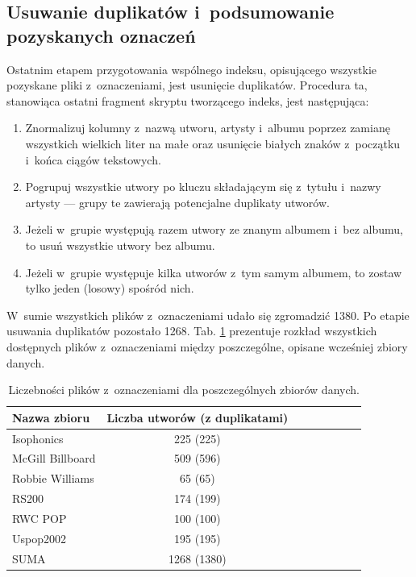 \subsection{Usuwanie duplikatów i~podsumowanie pozyskanych oznaczeń}

Ostatnim etapem przygotowania wspólnego indeksu, opisującego wszystkie pozyskane pliki z~oznaczeniami, jest usunięcie duplikatów. Procedura ta, stanowiąca ostatni fragment skryptu tworzącego indeks, jest następująca:

\begin{enumerate}
    \item Znormalizuj kolumny z~nazwą utworu, artysty i~albumu poprzez zamianę wszystkich wielkich
        liter na małe oraz usunięcie białych znaków z~początku i~końca ciągów tekstowych.
    \item Pogrupuj wszystkie utwory po kluczu składającym się z~tytułu i~nazwy artysty --- grupy te
        zawierają potencjalne duplikaty utworów.
    \item Jeżeli w~grupie występują razem utwory ze znanym albumem i~bez albumu, to usuń wszystkie
        utwory bez albumu.
    \item Jeżeli w~grupie występuje kilka utworów z~tym samym albumem, to zostaw tylko jeden
        (losowy) spośród nich.
\end{enumerate}

W~sumie wszystkich plików z~oznaczeniami udało się zgromadzić 1380. Po etapie usuwania duplikatów pozostało 1268. Tab. \ref{tab:datasets1} prezentuje rozkład wszystkich dostępnych plików z~oznaczeniami między poszczególne, opisane wcześniej zbiory danych.

\begin{table}
    \centering
    \caption{Liczebności plików z~oznaczeniami dla poszczególnych zbiorów danych.}
    \label{tab:datasets1}
    \begin{tabular}{|l|c|c|c|c|c|c|c|} \hline
        Nazwa zbioru & Liczba utworów (z duplikatami) \\ \hline
        Isophonics & 225 (225) \\
        McGill Billboard & 509 (596) \\
        Robbie Williams & 65 (65) \\
        RS200 & 174 (199) \\
        RWC POP & 100 (100) \\
        Uspop2002 & 195 (195) \\
        SUMA & 1268 (1380) \\ \hline
    \end{tabular}
\end{table}


